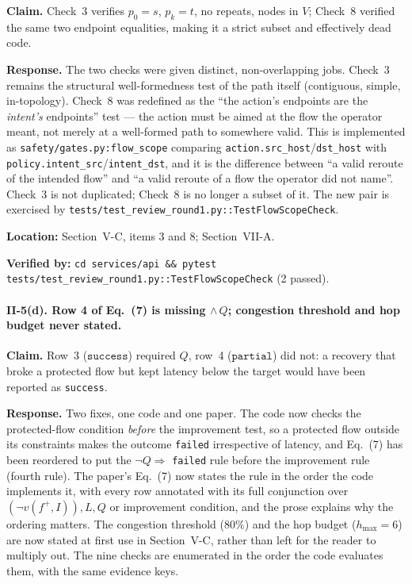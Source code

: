 \documentclass[11pt,a4paper]{article}
\begin{document}
\textbf{Claim.} Check~3 verifies $p_0=s$, $p_k=t$, no repeats, nodes in $V$;
Check~8 verified the same two endpoint equalities, making it a strict subset
and effectively dead code.

\textbf{Response.} The two checks were given distinct, non-overlapping jobs.
Check~3 remains the structural well-formedness test of the path itself
(contiguous, simple, in-topology). Check~8 was redefined as the
``the action's endpoints are the \emph{intent's} endpoints'' test --- the
action must be aimed at the flow the operator meant, not merely at a
well-formed path to somewhere valid. This is implemented as
\texttt{safety/gates.py:flow\_scope} comparing \texttt{action.src\_host}/\texttt{dst\_host}
with \texttt{policy.intent\_src}/\texttt{intent\_dst}, and it is the difference
between ``a valid reroute of the intended flow'' and ``a valid reroute of a
flow the operator did not name''. Check~3 is not duplicated; Check~8 is no
longer a subset of it. The new pair is exercised by
\texttt{tests/test\_review\_round1.py::TestFlowScopeCheck}.

\textbf{Location:} Section~V-C, items 3 and 8; Section~VII-A.

\textbf{Verified by:}
\texttt{cd services/api \&\& pytest tests/test\_review\_round1.py::TestFlowScopeCheck}\emph{\phantom{x}}
(2 passed).

\paragraph{II-5(d). Row 4 of Eq.~(7) is missing $\wedge\,Q$; congestion
threshold and hop budget never stated.}

\textbf{Claim.} Row~3 ($\texttt{success}$) required $Q$, row~4 ($\texttt{partial}$)
did not: a recovery that broke a protected flow but kept latency below the
target would have been reported as \texttt{success}.

\textbf{Response.} Two fixes, one code and one paper. The code now checks the
protected-flow condition \emph{before} the improvement test, so a protected flow
outside its constraints makes the outcome \texttt{failed} irrespective of
latency, and Eq.~(7) has been reordered to put the $\neg Q \Rightarrow$
\texttt{failed} rule before the improvement rule (fourth rule). The paper's
Eq.~(7) now states the rule in the order the code implements it, with every
row annotated with its full conjunction over \((\neg v(f^+,I)), L, Q\) or
improvement condition, and the prose explains why the ordering matters. The
congestion threshold ($80\%$) and the hop budget ($h_{\max} = 6$) are now
stated at first use in Section~V-C, rather than left for the reader to
multiply out. The nine checks are enumerated in the order the code evaluates
them, with the same evidence keys.
\end{document}
